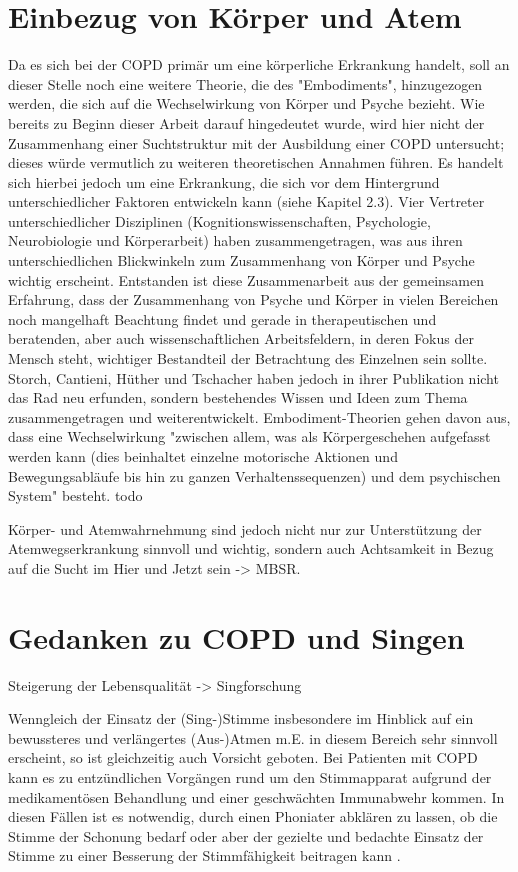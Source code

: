 \section{Einbezug von Körper und Atem} 
Da es sich bei der COPD primär um eine körperliche Erkrankung handelt, soll an dieser Stelle noch eine weitere Theorie, die des "Embodiments", hinzugezogen werden, die sich auf die Wechselwirkung von Körper und Psyche bezieht. Wie bereits zu Beginn dieser Arbeit darauf hingedeutet wurde, wird hier nicht der Zusammenhang einer Suchtstruktur mit der Ausbildung einer COPD untersucht; dieses würde vermutlich zu weiteren theoretischen Annahmen führen. Es handelt sich hierbei jedoch um eine Erkrankung, die sich vor dem Hintergrund unterschiedlicher Faktoren entwickeln kann (siehe Kapitel 2.3).
Vier Vertreter unterschiedlicher Disziplinen (Kognitionswissenschaften, Psychologie, Neurobiologie und Körperarbeit) haben zusammengetragen, was aus ihren unterschiedlichen Blickwinkeln zum Zusammenhang von Körper und Psyche wichtig erscheint. Entstanden ist diese Zusammenarbeit aus der gemeinsamen Erfahrung, dass der Zusammenhang von Psyche und Körper in vielen Bereichen noch mangelhaft Beachtung findet und gerade in therapeutischen und beratenden, aber auch wissenschaftlichen Arbeitsfeldern, in deren Fokus der Mensch steht, wichtiger Bestandteil der Betrachtung des Einzelnen sein sollte.
Storch, Cantieni, Hüther und Tschacher haben jedoch in ihrer Publikation nicht das Rad neu erfunden, sondern bestehendes Wissen und Ideen zum Thema zusammengetragen und weiterentwickelt. Embodiment-Theorien gehen davon aus, dass eine Wechselwirkung "zwischen allem, was als Körpergeschehen aufgefasst werden kann (dies beinhaltet einzelne motorische Aktionen und Bewegungsabläufe bis hin zu ganzen Verhaltenssequenzen) und dem psychischen System" \autocite[39]{hüther2010} besteht. todo

Körper- und Atemwahrnehmung sind jedoch nicht nur zur Unterstützung der Atemwegserkrankung sinnvoll und wichtig, sondern auch Achtsamkeit in Bezug auf die Sucht im Hier und Jetzt sein -> MBSR.

\section{Gedanken zu COPD und Singen}
Steigerung der Lebensqualität -> Singforschung

Wenngleich der Einsatz der (Sing-)Stimme insbesondere im Hinblick auf ein bewussteres und verlängertes (Aus-)Atmen m.E. in diesem Bereich sehr sinnvoll erscheint, so ist gleichzeitig auch Vorsicht geboten. Bei Patienten mit COPD kann es zu entzündlichen Vorgängen rund um den Stimmapparat aufgrund der medikamentösen Behandlung und einer geschwächten Immunabwehr kommen. In diesen Fällen ist es notwendig, durch einen Phoniater abklären zu lassen, ob die Stimme der Schonung bedarf oder aber der gezielte und bedachte Einsatz der Stimme zu einer Besserung der Stimmfähigkeit beitragen kann \autocite[vgl.][103ff.]{alavi2009}.

